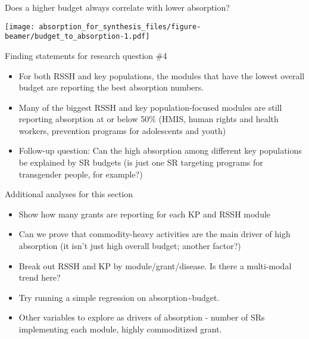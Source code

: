 \documentclass[ignorenonframetext,]{beamer}
\providecommand{\tightlist}{%
  \setlength{\itemsep}{0pt}\setlength{\parskip}{0pt}}
\begin{document}
\begin{frame}{Does a higher budget always correlate with lower
absorption?}
\protect\hypertarget{does-a-higher-budget-always-correlate-with-lower-absorption}{}

\texttt{[image: absorption\_for\_synthesis\_files/figure-beamer/budget\_to\_absorption-1.pdf]}

\end{frame}

\begin{frame}{Finding statements for research question \#4}
\protect\hypertarget{finding-statements-for-research-question-4}{}

\begin{itemize}
\tightlist
\item
  For both RSSH and key populations, the modules that have the lowest
  overall budget are reporting the best absorption numbers.
\item
  Many of the biggest RSSH and key population-focused modules are still
  reporting absorption at or below 50\% (HMIS, human rights and health
  workers, prevention programs for adolescents and youth)
\item
  Follow-up question: Can the high absorption among different key
  populations be explained by SR budgets (is just one SR targeting
  programs for transgender people, for example?)
\end{itemize}

\end{frame}

\begin{frame}{Additional analyses for this section}
\protect\hypertarget{additional-analyses-for-this-section-2}{}

\begin{itemize}
\tightlist
\item
  Show how many grants are reporting for each KP and RSSH module
\item
  Can we prove that commodity-heavy activities are the main driver of
  high absorption (it isn't just high overall budget; another factor?)
\item
  Break out RSSH and KP by module/grant/disease. Is there a multi-modal
  trend here?
\item
  Try running a simple regression on absorption\textasciitilde{}budget.
\item
  Other variables to explore as drivers of absorption - number of SRs
  implementing each module, highly commoditized grant.
\end{itemize}

\end{frame}
\end{document}
